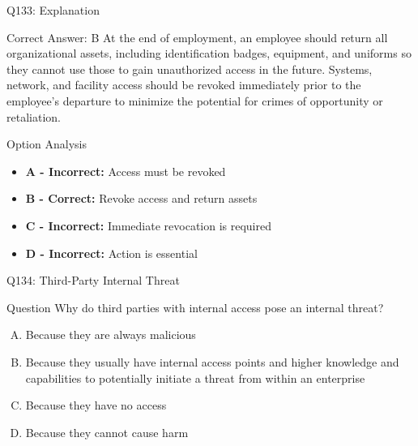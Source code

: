 \documentclass{beamer}
\begin{document}
	\begin{frame}{Q133: Explanation}
		\begin{block}{Correct Answer: B}
			At the end of employment, an employee should return all organizational assets, including identification badges, equipment, and uniforms so they cannot use those to gain unauthorized access in the future. Systems, network, and facility access should be revoked immediately prior to the employee's departure to minimize the potential for crimes of opportunity or retaliation.
		\end{block}
		\begin{block}{Option Analysis}
			\begin{itemize}
				\item \textbf{A - Incorrect:} Access must be revoked
				\item \textbf{B - Correct:} Revoke access and return assets
				\item \textbf{C - Incorrect:} Immediate revocation is required
				\item \textbf{D - Incorrect:} Action is essential
			\end{itemize}
		\end{block}
	\end{frame}
	
	\begin{frame}{Q134: Third-Party Internal Threat}
		\begin{block}{Question}
			Why do third parties with internal access pose an internal threat?
		\end{block}
		\begin{enumerate}[(A)]
			\item Because they are always malicious
			\item Because they usually have internal access points and higher knowledge and capabilities to potentially initiate a threat from within an enterprise
			\item Because they have no access
			\item Because they cannot cause harm
		\end{enumerate}
	\end{frame}
	
\end{document}
